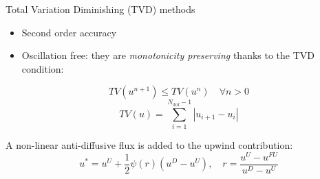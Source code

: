 \documentclass{beamer}
\begin{document}
\begin{frame}{Total Variation Diminishing (TVD) methods}
\begin{itemize}
	\item Second order accuracy
	\item Oscillation free: they are \emph{monotonicity preserving} thanks to 
	the TVD condition:
\end{itemize}
\vspace{0.3cm}
\begin{equation*}
	TV(u^{n+1}) \leq TV(u^n) \quad \forall n>0
\end{equation*}
\begin{equation*}
	TV(u) = 
	\sum_{i=1}^{N_\text{dof}-1} |u_{i+1} - u_i|
\end{equation*}

\vspace{0.3cm}
A non-linear anti-diffusive flux is added to the upwind contribution:
\begin{equation*}
u^* = u^U + \frac{1}{2} \psi(r)(u^D - u^U), \quad r = \frac{u^U - u^{FU}}{u^D 
- u^U}
\end{equation*}
\end{frame}
\end{document}
